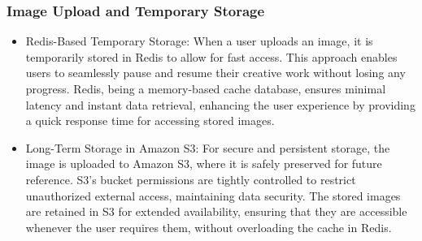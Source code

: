 \documentclass[conference]{IEEEtran}
\begin{document}
\subsubsection{Image Upload and Temporary Storage}
\begin{itemize}
    \item Redis-Based Temporary Storage: When a user uploads an image, it is temporarily stored in Redis to allow for fast access. This approach enables users to seamlessly pause and resume their creative work without losing any progress. Redis, being a memory-based cache database, ensures minimal latency and instant data retrieval, enhancing the user experience by providing a quick response time for accessing stored images.\\
    \item Long-Term Storage in Amazon S3: For secure and persistent storage, the image is uploaded to Amazon S3, where it is safely preserved for future reference. S3’s bucket permissions are tightly controlled to restrict unauthorized external access, maintaining data security. The stored images are retained in S3 for extended availability, ensuring that they are accessible whenever the user requires them, without overloading the cache in Redis.\\
\end{itemize}
\
\end{document}
